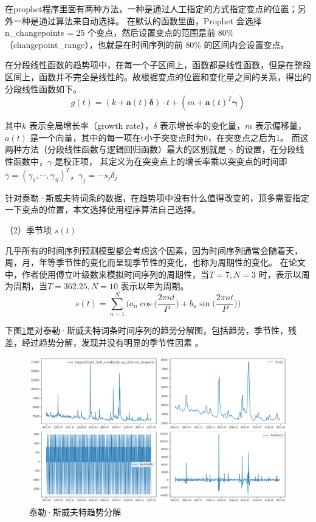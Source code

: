 在prophet程序里面有两种方法，一种是通过人工指定的方式指定变点的位置；另外一种是通过算法来自动选择。
在默认的函数里面，Prophet 会选择 n\_changepoints = 25 个变点，然后设置变点的范围是前 80\%（changepoint\_range），也就是在时间序列的前 80\% 的区间内会设置变点。

在分段线性函数的趋势项中，在每一个子区间上，函数都是线性函数，但是在整段区间上，函数并不完全是线性的。故根据变点的位置和变化量之间的关系，得出的分段线性函数如下。
\begin{equation}
  g(t) = (k + \mathbf{a}(t)\mathbf{\delta}) \cdot t + (m + \mathbf{a}(t)^T\mathbf{\gamma})
\end{equation}

其中$k$ 表示全局增长率（growth rate），$\delta$ 表示增长率的变化量，$m$ 表示偏移量，$a(t)$ 是一个向量，其中的每一项在t小于突变点时为0，在突变点之后为1。
而这两种方法（分段线性函数与逻辑回归函数）最大的区别就是 $\gamma$ 的设置，在分段线性函数中，$\gamma$ 是校正项，
其定义为在突变点上的增长率乘以突变点的时间即 $\gamma=(\gamma_{1},\cdots,\gamma_{S})^{T}$，$\gamma_{j}=-s_{j}\delta_{j}$ 

针对泰勒·斯威夫特词条的数据，在趋势项中没有什么值得改变的，顶多需要指定一下变点的位置，本文选择使用程序算法自己选择。

（2）季节项 $s(t)$

几乎所有的时间序列预测模型都会考虑这个因素，因为时间序列通常会随着天，周，月，年等季节性的变化而呈现季节性的变化，也称为周期性的变化。
在论文中\cite{taylor2018forecasting}，作者使用傅立叶级数来模拟时间序列的周期性，当$T = 7, N = 3$ 时，表示以周为周期，当$T = 362.25, N = 10$ 表示以年为周期。
\begin{equation}
  s(t) = \sum_{n=1}^{N}\bigg( a_{n}\cos\bigg(\frac{2\pi n t}{P}\bigg) + b_{n}\sin\bigg(\frac{2\pi n t}{P}\bigg)\bigg)
\end{equation}

下图\ref{Trend-decomposition}是对泰勒·斯威夫特词条时间序列的趋势分解图，包括趋势，季节性，残差，经过趋势分解，发现并没有明显的季节性因素
。

\begin{figure}[htb]
  \centering
  \includegraphics[width=\textwidth]{figures/Trend-decomposition.png}
  \caption{泰勒·斯威夫特趋势分解}
  \label{Trend-decomposition}
\end{figure}

